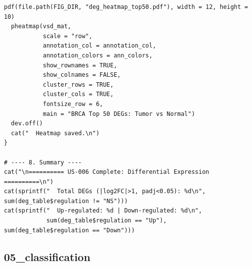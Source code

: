 \documentclass[12pt,a4paper]{ctexart}
\begin{document}
\begin{lstlisting}[caption={04_diff_expression}, basicstyle=\ttfamily\scriptsize]
  pdf(file.path(FIG_DIR, "deg_heatmap_top50.pdf"), width = 12, height = 10)
  pheatmap(vsd_mat,
           scale = "row",
           annotation_col = annotation_col,
           annotation_colors = ann_colors,
           show_rownames = TRUE,
           show_colnames = FALSE,
           cluster_rows = TRUE,
           cluster_cols = TRUE,
           fontsize_row = 6,
           main = "BRCA Top 50 DEGs: Tumor vs Normal")
  dev.off()
  cat("  Heatmap saved.\n")
}

# ---- 8. Summary ----
cat("\n========== US-006 Complete: Differential Expression ==========\n")
cat(sprintf("  Total DEGs (|log2FC|>1, padj<0.05): %d\n", sum(deg_table$regulation != "NS")))
cat(sprintf("  Up-regulated: %d | Down-regulated: %d\n",
            sum(deg_table$regulation == "Up"), sum(deg_table$regulation == "Down")))
\end{lstlisting}

\subsection{05_classification}
\end{document}
